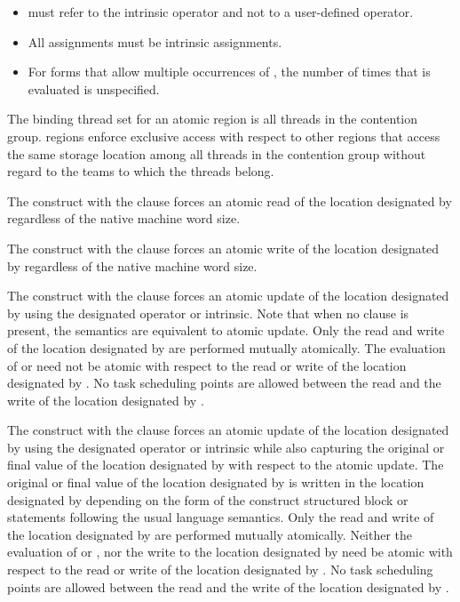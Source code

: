 \begin{itemize}
\item {} must refer to the intrinsic operator and not to a user-defined operator.

\item All assignments must be intrinsic assignments.

\item For forms that allow multiple occurrences of , the number of times that  is 
evaluated is unspecified.
\fortranspecificend

\end{itemize}

\binding
The binding thread set for an atomic region is all threads in the contention group. 
 regions enforce exclusive access with respect to other  regions that 
access the same storage location  among all threads in the contention group without 
regard to the teams to which the threads belong. 

\descr
The  construct with the  clause forces an atomic read of the location 
designated by  regardless of the native machine word size.

The  construct with the  clause forces an atomic write of the location 
designated by  regardless of the native machine word size.

The  construct with the  clause forces an atomic update of the location 
designated by  using the designated operator or intrinsic. Note that when no clause is 
present, the semantics are equivalent to atomic update. Only the read and write of the 
location designated by  are performed mutually atomically. The evaluation of  or 
 need not be atomic with respect to the read or write of the location designated 
by . No task scheduling points are allowed between the read and the write of the 
location designated by .

The  construct with the  clause forces an atomic update of the 
location designated by  using the designated operator or intrinsic while also capturing 
the original or final value of the location designated by  with respect to the atomic 
update. The original or final value of the location designated by  is written in the 
location designated by  depending on the form of the  construct structured 
block or statements following the usual language semantics. Only the read and write of 
the location designated by  are performed mutually atomically. Neither the evaluation 
of  or , nor the write to the location designated by  need be atomic with 
respect to the read or write of the location designated by . No task scheduling points 
are allowed between the read and the write of the location designated by .

